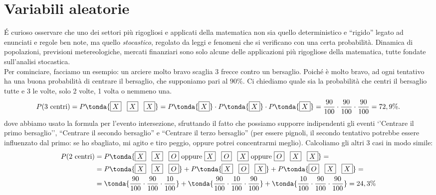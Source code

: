 
\chapter{Variabili aleatorie}

\'E curioso osservare che uno dei settori più rigogliosi e applicati della matematica non sia quello deterministico e ``rigido'' legato ad enunciati e regole ben note, ma quello \emph{stocastico}, regolato da leggi e fenomeni che si verificano con una certa probabilità. Dinamica di popolazioni, previsioni metereologiche, mercati finanziari sono solo alcune delle applicazioni più rigogliose della matematica, tutte fondate sull'analisi stocastica.\\

Per cominciare, facciamo un esempio: un arciere molto bravo scaglia 3 frecce contro un bersaglio. Poiché è molto bravo, ad ogni tentativo ha una buona probabilità di centrare il bersaglio, che supponiamo pari al \(90\%\). Ci chiediamo quale sia la probabilità che centri il bersaglio tutte e 3 le volte, solo 2 volte, 1 volta o nemmeno una.
\[ P(\text{3 centri})= P\tonda{\text{\boxed{X} \, \boxed{X} \, \boxed{X}}} = P \tonda{\text{\boxed{X}}} \cdot P \tonda{\text{\boxed{X}}} \cdot P \tonda{\text{\boxed{X}}} = \dfrac{90}{100} \cdot \dfrac{90}{100}  \cdot \dfrac{90}{100}   = 
72,9\%. \]
dove abbiamo usato la formula per l'evento intersezione, sfruttando il fatto che possiamo supporre indipendenti gli eventi `'Centrare il primo bersaglio'', ``Centrare il secondo bersaglio'' e ``Centrare il terzo bersaglio'' (per essere pignoli, il secondo tentativo potrebbe essere influenzato dal primo: se ho sbagliato, mi agito e tiro peggio, oppure potrei concentrarmi meglio). Calcoliamo gli altri 3 casi in modo simile:
\[ \begin{split} P(\text{2 centri})&= P\tonda{\text{\boxed{X} \, \boxed{X} \, \boxed{O}} \text{ oppure } \text{\boxed{X} \, \boxed{O} \, \boxed{X}} \text{ oppure } \text{\boxed{O} \, \boxed{X} \, \boxed{X}}} =\\ &= 
P\tonda{\text{\boxed{X} \, \boxed{X} \, \boxed{O}}} +P\tonda{\text{\boxed{X} \, \boxed{O} \, \boxed{X}}} + P\tonda{ \text{\boxed{O} \, \boxed{X} \, \boxed{X}}} =\\ &=
 \tonda{\dfrac{90}{100} \cdot \dfrac{90}{100}  \cdot \dfrac{10}{100}}+ \tonda{\dfrac{90}{100} \cdot \dfrac{10}{100}  \cdot \dfrac{90}{100}}+ \tonda{\dfrac{10}{100} \cdot \dfrac{90}{100}  \cdot \dfrac{90}{100} }  = 24,3 \%  \end{split}\]
 
